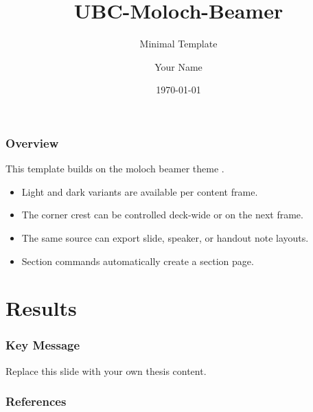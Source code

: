 \documentclass[aspectratio=169,11pt]{beamer}
\title{UBC-Moloch-Beamer}
\subtitle{Minimal Template}
\author{Your Name}
\institute{The University of British Columbia}
\date{\today}
\begin{document}
\UBCTitlePage[variant=light]

\begin{frame}
  \frametitle{Overview}
  This template builds on the moloch beamer theme \cite{jolars-moloch}.
  \begin{itemize}
    \item Light and dark variants are available per content frame.
    \item The corner crest can be controlled deck-wide or on the next frame.
    \item The same source can export slide, speaker, or handout note layouts.
    \item Section commands automatically create a section page.
  \end{itemize}
\end{frame}

\section{Results}

\begin{frame}
  \frametitle{Key Message}
  Replace this slide with your own thesis content.
\end{frame}

\begin{frame}[allowframebreaks]
  \frametitle{References}
  
  
\end{frame}
\end{document}
